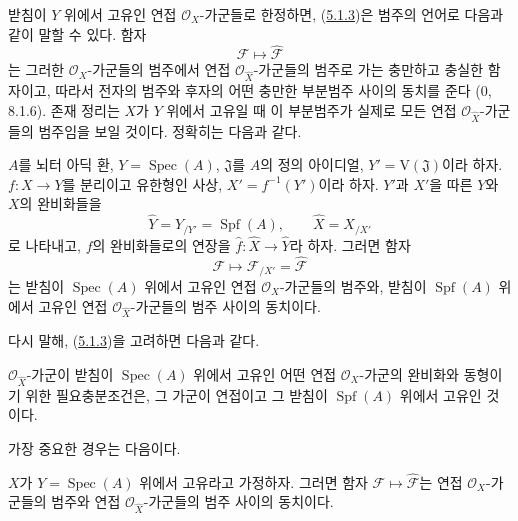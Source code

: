 받침이 $Y$ 위에서 고유인 연접 $\mathcal O_X$-가군들로 한정하면,
(\hyperref[III.5.1.3-fr]{5.1.3})은 범주의 언어로 다음과 같이
말할 수 있다. 함자
\[
\mathcal F\longmapsto\widehat{\mathcal F}
\]
는 그러한 $\mathcal O_X$-가군들의 범주에서 연접
$\mathcal O_{\widehat X}$-가군들의 범주로 가는 충만하고 충실한
함자이고, 따라서 전자의 범주와 후자의 어떤 충만한 부분범주
사이의 동치를 준다 (0, 8.1.6). 존재 정리는 $X$가 $Y$ 위에서
고유일 때 이 부분범주가 실제로 모든 연접
$\mathcal O_{\widehat X}$-가군들의 범주임을 보일 것이다. 정확히는
다음과 같다.

\begin{theorem}[5.1.4]
\label{III.5.1.4-fr}
$A$를 뇌터 아딕 환, $Y=\operatorname{Spec}(A)$,
$\mathfrak J$를 $A$의 정의 아이디얼,
$Y'=\mathrm V(\mathfrak J)$이라 하자.
$f:X\to Y$를 분리이고 유한형인 사상,
$X'=f^{-1}(Y')$이라 하자. $Y'$과 $X'$을 따른 $Y$와 $X$의
완비화들을
\[
\widehat Y=Y_{/Y'}=\operatorname{Spf}(A),\qquad
\widehat X=X_{/X'}
\]
로 나타내고, $f$의 완비화들로의 연장을
$\widehat f:\widehat X\to\widehat Y$라 하자. 그러면 함자
\[
\mathcal F\longmapsto
\mathcal F_{/X'}=\widehat{\mathcal F}
\]
는 받침이 $\operatorname{Spec}(A)$ 위에서 고유인 연접
$\mathcal O_X$-가군들의 범주와, 받침이
$\operatorname{Spf}(A)$ 위에서 고유인 연접
$\mathcal O_{\widehat X}$-가군들의 범주 사이의 동치이다.
\end{theorem}

다시 말해, (\hyperref[III.5.1.3-fr]{5.1.3})을 고려하면 다음과
같다.

\begin{corollary}[5.1.5]
\label{III.5.1.5-fr}
$\mathcal O_{\widehat X}$-가군이 받침이
$\operatorname{Spec}(A)$ 위에서 고유인 어떤 연접
$\mathcal O_X$-가군의 완비화와 동형이기 위한 필요충분조건은,
그 가군이 연접이고 그 받침이 $\operatorname{Spf}(A)$ 위에서
고유인 것이다.
\end{corollary}

가장 중요한 경우는 다음이다.

\begin{corollary}[5.1.6]
\label{III.5.1.6-fr}
$X$가 $Y=\operatorname{Spec}(A)$ 위에서 고유라고 가정하자.
그러면 함자
$\mathcal F\mapsto\widehat{\mathcal F}$는 연접
$\mathcal O_X$-가군들의 범주와 연접
$\mathcal O_{\widehat X}$-가군들의 범주 사이의 동치이다.
\end{corollary}

